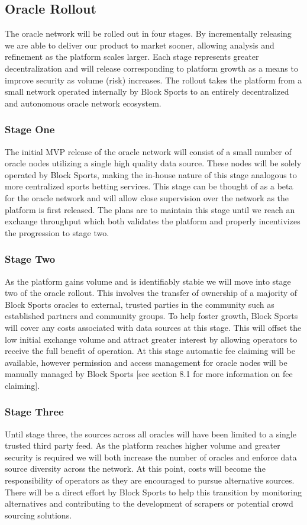 \documentclass{article}
\begin{document}
	\subsection{Oracle Rollout}
The oracle network will be rolled out in four stages. By incrementally releasing we are able to deliver our product to market sooner, allowing analysis and refinement as the platform scales larger. Each stage represents greater decentralization and will release corresponding to platform growth as a means to improve security as volume (risk) increases. The rollout takes the platform from a small network operated internally by Block Sports to an entirely decentralized and autonomous oracle network ecosystem. 

		\subsubsection{Stage One}
		The initial MVP release of the oracle network will consist of a small number of oracle nodes utilizing a single high quality data source. These nodes will be solely operated by Block Sports, making the in-house nature of this stage analogous to more centralized sports betting services. This stage can be thought of as a beta for the oracle network and will allow close supervision over the network as the platform is first released. The plans are to maintain this stage until we reach an exchange throughput which both validates the platform and properly incentivizes the progression to stage two.
		
		\subsubsection{Stage Two}
		As the platform gains volume and is identifiably stabie we will move into stage two of the oracle rollout. This involves the transfer of ownership of a majority of Block Sports oracles to external, trusted parties in the community such as established partners and community groups. To help foster growth, Block Sports will cover any costs associated with data sources at this stage. This will offset the low initial exchange volume and attract greater interest by allowing operators to receive the full benefit of operation. At this stage automatic fee claiming will be available, however permission and access management for oracle nodes will be manually managed by Block Sports [see section 8.1 for more information on fee claiming].

		\subsubsection{Stage Three}
		Until stage three, the sources across all oracles will have been limited to a single trusted third party feed. As the platform reaches higher volume and greater security is required we will both increase the number of oracles and enforce data source diversity across the network. At this point, costs will become the responsibility of operators as they are encouraged to pursue alternative sources. There will be a direct effort by Block Sports to help this transition by monitoring alternatives and contributing to the development of scrapers or potential crowd sourcing solutions.
		
\end{document}

